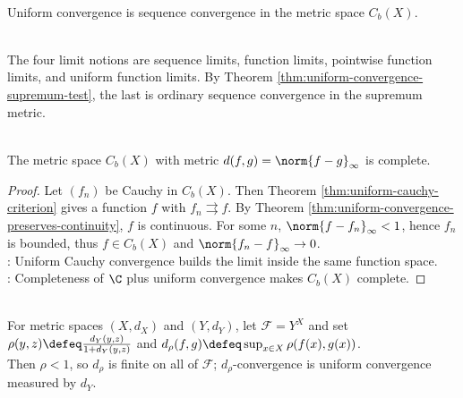 \begin{perspective} \label{per:supremum-metric-function-space-lens} \\
Uniform convergence is sequence convergence in the metric space $C_b(X)$.
\end{perspective}

\begin{perspective} \label{per:four-limit-notions-function-space-view} \\
The four limit notions are sequence limits, function limits, pointwise function limits, and uniform function limits. By Theorem \ref{thm:uniform-convergence-supremum-test}, the last is ordinary sequence convergence in the supremum metric.
\end{perspective}

\begin{theorem} \label{thm:complete-supremum-metric-space} \\
The metric space $C_b(X)$ with metric $d(f,g)=\norm{f-g}_{\infty}$ is complete.
\begin{proof}
Let $(f_n)$ be Cauchy in $C_b(X)$. Then Theorem \ref{thm:uniform-cauchy-criterion} gives a function $f$ with $f_n\rightrightarrows f$. By Theorem \ref{thm:uniform-convergence-preserves-continuity}, $f$ is continuous. For some $n$, $\norm{f-f_n}_{\infty}<1$, hence $f_n$ is bounded, thus $f\in C_b(X)$ and $\norm{f_n-f}_{\infty}\to0$.\\
: Uniform Cauchy convergence builds the limit inside the same function space.\\
: Completeness of $\C$ plus uniform convergence makes $C_b(X)$ complete.
\end{proof}
\end{theorem}

\begin{definition} \label{def:bounded-target-metric-function-space} \\
For metric spaces $(X,d_X)$ and $(Y,d_Y)$, let $\mathcal{F}=Y^X$ and set $\rho(y,z)\defeq\frac{d_Y(y,z)}{1+d_Y(y,z)}$ and $d_\rho(f,g)\defeq\sup_{x\in X}\rho(f(x),g(x))$.\\
Then $\rho<1$, so $d_\rho$ is finite on all of $\mathcal{F}$; $d_\rho$-convergence is uniform convergence measured by $d_Y$.
\end{definition}

